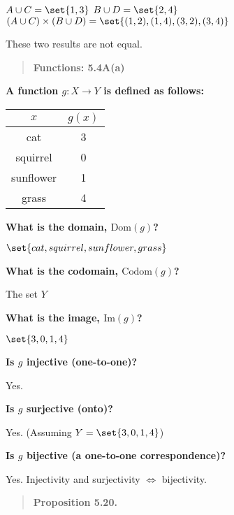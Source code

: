 \(A \cup C = \set{1,3}\) \(B \cup D = \set{2,4}\)
\((A \cup C) \times (B \cup D) = \set{(1,2), (1,4), (3,2), (3,4)}\)

These two results are not equal.

\begin{quote}
\textbf{Functions: 5.4A(a)}
\end{quote}

\textbf{A function \(g:X\rightarrow Y\) is defined as follows:}

\begin{longtable}[]{@{}cc@{}}
\toprule\noalign{}
\(x\) & \(g(x)\) \\
\midrule\noalign{}
\endhead
\bottomrule\noalign{}
\endlastfoot
cat & 3 \\
squirrel & 0 \\
sunflower & 1 \\
grass & 4 \\
\end{longtable}

\textbf{What is the domain, \(\text{Dom}(g)\)?}

\(\set{cat, squirrel, sunflower, grass}\)

\textbf{What is the codomain, \(\text{Codom}(g)\)?}

The set \(Y\)

\textbf{What is the image, \(\text{Im}(g)\)?}

\(\set{3, 0, 1, 4}\)

\textbf{Is \(g\) injective (one-to-one)?}

Yes.

\textbf{Is \(g\) surjective (onto)?}

Yes. (Assuming \(Y=\set{3,0,1,4}\))

\textbf{Is \(g\) bijective (a one-to-one correspondence)?}

Yes. Injectivity and surjectivity \(\iff\) bijectivity.

\begin{quote}
\textbf{Proposition 5.20.}
\end{quote}

